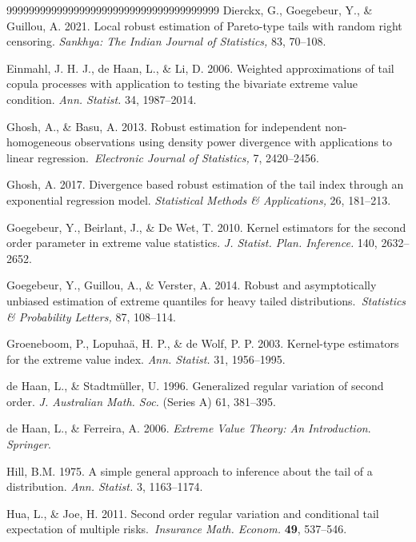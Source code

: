 \documentclass[12pt,reqno,openbib,runningheads,a4paper,portrait]{amsart}%
\begin{document}
\begin{thebibliography}{99999999999999999999999999999999999999}
Dierckx, G., Goegebeur, Y., \&
Guillou, A. 2021. Local robust estimation of Pareto-type tails with random
right censoring. \textit{Sankhya: The Indian Journal of Statistics,} 83, 70--108.

Einmahl, J. H. J., de Haan,
L., \& Li, D. 2006. Weighted approximations of tail copula processes with
application to testing the bivariate extreme value condition. \textit{Ann.
Statist.} 34, 1987--2014.

Ghosh, A., \& Basu, A. 2013. Robust
estimation for independent non-homogeneous observations using density power
divergence with applications to linear regression.\textit{\ Electronic Journal
of Statistics,} 7, 2420--2456.

Ghosh, A. 2017. Divergence based robust
estimation of the tail index through an exponential regression model.
\textit{Statistical Methods \& Applications,} 26, 181--213.

Goegebeur, Y., Beirlant, J.,
\& De Wet, T. 2010. Kernel estimators for the second order parameter in
extreme value statistics. \textit{J. Statist. Plan. Inference. }140, 2632--2652.

Goegebeur, Y., Guillou, A.,
\& Verster, A. 2014. Robust and asymptotically unbiased estimation of extreme
quantiles for heavy tailed distributions.\textit{\ Statistics \& Probability
Letters,} 87, 108--114.

Groeneboom, P.,
Lopuha\"{a}, H. P., \& de Wolf, P. P. 2003. Kernel-type estimators for the
extreme value index. \textit{Ann. Statist.} 31, 1956--1995.

de Haan, L., \&
Stadtm\"{u}ller, U. 1996. Generalized regular variation of second order.
\textit{J. Australian Math. Soc.} (Series A) 61, 381--395.

de Haan, L., \& Ferreira, A. 2006.
\textit{Extreme Value Theory: An Introduction}. \textit{Springer}.

Hill, B.M. 1975. A simple general approach to
inference about the tail of a distribution. \textit{Ann. Statist.} 3, 1163--1174.

Hua, L., \& Joe, H. 2011. Second order
regular variation and conditional tail expectation of multiple
risks.\textit{\ Insurance Math. Econom.} \textbf{49}, 537--546.


\end{thebibliography}
\end{document}
